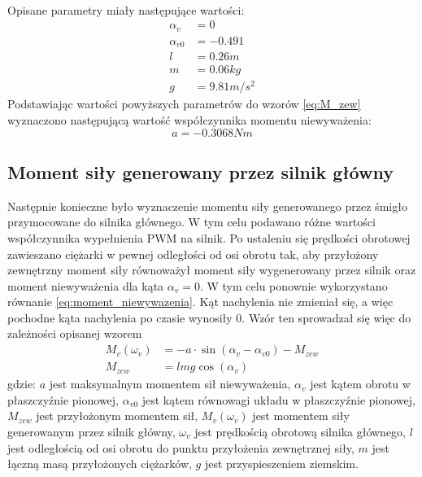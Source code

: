 \documentclass[11pt,a4paper]{article}
\begin{document}
\paragraph*{}
Opisane parametry miały następujące wartości:
\begin{equation}
\begin{aligned}
\alpha_v &= 0\\
\alpha_{v0} &= -0.491\\
l &= 0.26\si{m}\\
m &= 0.06\si{kg}\\
g &= 9.81\si{m/s^2}
\end{aligned}
\end{equation}
Podstawiając wartości powyższych parametrów do wzorów \eqref{eq:M_zew} wyznaczono następującą wartość współczynnika momentu niewyważenia:
\begin{equation}
a = -0.3068\si{Nm}
\end{equation}

\subsection{Moment siły generowany przez silnik główny}
Następnie konieczne było wyznaczenie momentu siły generowanego przez śmigło przymocowane do silnika głównego. W tym celu podawano różne wartości współczynnika wypełnienia PWM na silnik. Po ustaleniu się prędkości obrotowej zawieszano ciężarki w pewnej odległości od osi obrotu tak, aby przyłożony zewnętrzny moment siły równoważył moment siły wygenerowany przez silnik oraz moment niewyważenia dla kąta \(\alpha_v=0\). W tym celu ponownie wykorzystano równanie \eqref{eq:moment_niewywazenia}. Kąt nachylenia nie zmieniał się, a więc pochodne kąta nachylenia po czasie wynosiły \(0\). Wzór ten sprowadzał się więc do zależności opisanej wzorem
\begin{equation}
\begin{aligned}
M_v(\omega_v) &= -a\cdot \sin(\alpha_v-\alpha_{v0})-M_{zew}\\
M_{zew} &= lmg\cos(\alpha_v)
\end{aligned}
\label{eq:moment_sily_glowny}
\end{equation}
\noindent gdzie:\newline
\(a\) jest maksymalnym momentem sił niewyważenia,\newline
\(\alpha_v\) jest kątem obrotu w płaszczyźnie pionowej,\newline
\(\alpha_{v0}\) jest kątem równowagi układu w płaszczyźnie pionowej,\newline
\(M_{zew}\) jest przyłożonym momentem sił,\newline
\(M_v(\omega_v)\) jest momentem siły generowanym przez silnik główny,\newline
\(\omega_v\) jest prędkością obrotową silnika głównego,\newline
\(l\) jest odległością od osi obrotu do punktu przyłożenia zewnętrznej siły,\newline
\(m\) jest łączną masą przyłożonych ciężarków,\newline
\(g\) jest przyspieszeniem ziemskim.
\end{document}

